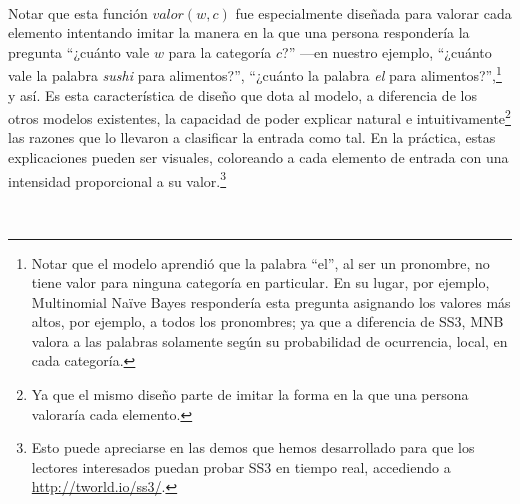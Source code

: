 \


Notar que esta función $valor(w,c)$ fue especialmente diseñada para valorar cada elemento intentando imitar la manera en la que una persona respondería la pregunta ``¿cuánto vale $w$ para la categoría $c$?'' ---en nuestro ejemplo, ``¿cuánto vale la palabra \emph{sushi} para alimentos?'', ``¿cuánto la palabra \emph{el} para alimentos?'',\footnote{Notar que el modelo aprendió que la palabra ``el'', al ser un pronombre, no tiene valor para ninguna categoría en particular. En su lugar, por ejemplo, Multinomial Naïve Bayes respondería esta pregunta asignando los valores más altos, por ejemplo, a todos los pronombres; ya que a diferencia de SS3, MNB valora a las palabras solamente según su probabilidad de ocurrencia, local, en cada categoría.} y así.
Es esta característica de diseño que dota al modelo, a diferencia de los otros modelos existentes, la capacidad de poder explicar natural e intuitivamente\footnote{Ya que el mismo diseño parte de imitar la forma en la que una persona valoraría cada elemento.} las razones que lo llevaron a clasificar la entrada como tal. En la práctica, estas explicaciones pueden ser visuales, coloreando a cada elemento de entrada con una intensidad proporcional a su valor.\footnote{Esto puede apreciarse en las demos que hemos desarrollado para que los lectores interesados puedan probar SS3 en tiempo real, accediendo a  \url{http://tworld.io/ss3/}.}

\

